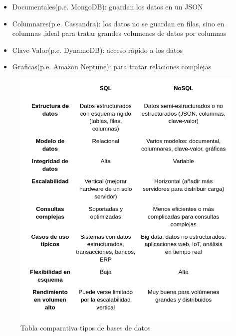 \begin{itemize}
	\item Documentales(p.e. MongoDB): guardan los datos en un JSON
	\item Columnares(p.e. Cassandra): los datos no se guardan en filas, sino en columnas ,ideal para tratar grandes volumenes de datos por columnas
	\item Clave-Valor(p.e. DynamoDB): acceso rápido a los datos
	\item Graficas(p.e. Amazon Neptune): para tratar relaciones complejas
\end{itemize}

\begin{figure}[H]
   \centering
    \includegraphics[width=\textwidth]{tablas/BDS.png}
    \caption{Tabla comparativa tipos de bases de datos}
    \label{fig:Tabla BDS}
\end{figure} 

